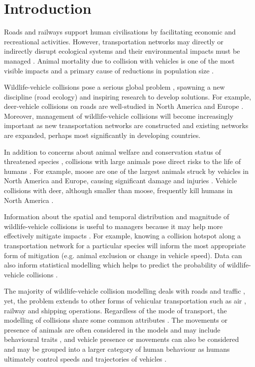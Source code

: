 \newpage
\section{Introduction}

Roads and railways support human civilisations by facilitating economic and recreational activities. However, transportation networks may directly or indirectly disrupt ecological systems \citep{seil06,rvdr15} and their environmental impacts must be managed \citep{spel98}. Animal mortality due to collision with vehicles is one of the most visible impacts \citep{form03} and a primary cause of reductions in population size \citep{fahr09}.
 
Wildlife-vehicle collisions pose a serious global problem \citep{litv08}, spawning a new discipline (road ecology) and inspiring research to develop solutions. For example, deer-vehicle collisions on roads are well-studied in North America \citep{huij07a,romi96} and Europe \citep{saen15,seil04}. Moreover, management of wildlife-vehicle collisions will become increasingly important as new transportation networks are constructed and existing networks are expanded, perhaps most significantly in developing countries.

In addition to concerns about animal welfare \citep{sain95} and conservation status of threatened species \citep{dwye16,jone00}, collisions with large animals pose direct risks to the life of humans \citep{lang06,rowd08}.  For example, moose are one of the largest animals struck by vehicles in North America and Europe, causing significant damage and injuries \citep{huij07a,hurl09}.  Vehicle collisions with deer, although smaller than moose, frequently kill humans in North America \citep{will05}.

Information about the spatial and temporal distribution and magnitude of wildlife-vehicle collisions is useful to managers because it may help more effectively mitigate impacts \citep{moun09}. For example, knowing a collision hotspot along a transportation network for a particular species will inform the most appropriate form of mitigation (e.g. animal exclusion or change in vehicle speed). Data can also inform statistical modelling which helps to predict the probability of wildlife-vehicle collisions \citep{guns11}.

The majority of wildlife-vehicle collision modelling deals with roads and traffic \citep{rvdr15}, yet, the problem extends to other forms of vehicular transportation such as air \citep{vanb07}, railway \citep{well99} and shipping \citep{lais01} operations. Regardless of the mode of transport, the modelling of collisions share some common attributes \citep{form03}. The movements or presence of animals are often considered in the models and may include behavioural traits \citep{roge09}, and vehicle presence or movements can also be considered and may be grouped into a larger category of human behaviour as humans ultimately control speeds and trajectories of vehicles \citep{ramp08}.

